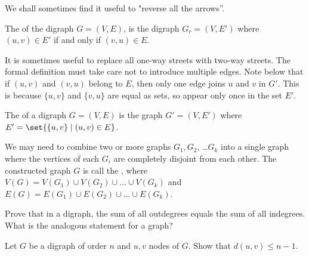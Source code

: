 \begin{Example}

\end{Example}

We shall sometimes find it useful to "reverse all the arrows''.

\begin{Definition}
The  of the digraph $G = (V, E)$, is the 
digraph $G_r = (V, E')$ where $(u, v)\in E'$ if and only if $(v, u)\in E$.
\end{Definition}

\begin{Example}


\end{Example}

It is sometimes useful to replace all one-way streets with two-way
streets. The formal definition must take care not to introduce multiple
edges. Note below that if $(u, v)$ and $(v, u)$ belong to $E$, then only
one edge joins $u$ and $v$ in $G'$.  This is because $\{u, v\}$ and
$\{v, u\}$ are equal as sets, so appear only once in the set $E'$.

\begin{Definition}
The  of a digraph $G = (V, E)$ is the graph 
$G' = (V, E')$ where $E' = \set{\{u, v\} \mid (u, v)\in E}$.

\end{Definition}

\begin{Example}


\end{Example}


We may need to combine two or more graphs $G_1, G_2$, \ldots $G_k$ into a single
graph where the vertices of each $G_i$ are completely disjoint from each other.  
The constructed graph $G$ is call the , 
where $V(G) = V(G_1) \cup V(G_2) \cup \ldots \cup V(G_k)$ and $E(G) = E(G_1) \cup
E(G_2) \cup \ldots \cup E(G_k)$.

\begin{Exercise}
\label{ex:degree}
Prove that in a digraph, the sum of all outdegrees equals the sum of all 
indegrees. What is the analogous statement for a graph? 
\end{Exercise}

\begin{Exercise}
\label{ex:distbound}
Let $G$ be a digraph of order $n$ and $u, v$ nodes of $G$. 
Show that $d(u, v) \leq n - 1$.
\end{Exercise}

